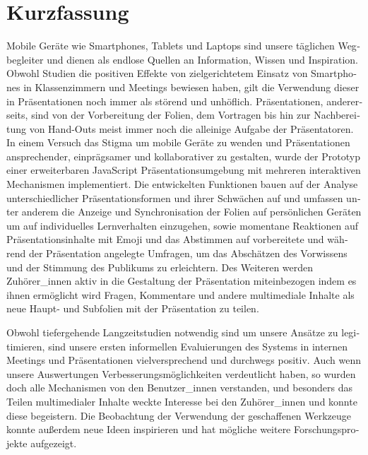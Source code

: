 \chapter{Kurzfassung}

\begin{german}
Mobile Geräte wie Smartphones, Tablets und Laptops sind unsere täglichen Wegbegleiter und dienen als endlose Quellen an Information, Wissen und Inspiration. Obwohl Studien die positiven Effekte von zielgerichtetem Einsatz von Smartphones in Klassenzimmern und Meetings bewiesen haben, gilt die Verwendung dieser in Präsentationen noch immer als störend und unhöflich. Präsentationen, andererseits, sind von der Vorbereitung der Folien, dem Vortragen bis hin zur Nachbereitung von Hand-Outs meist immer noch die alleinige Aufgabe der Präsentatoren. In einem Versuch das Stigma um mobile Geräte zu wenden und Präsentationen ansprechender, einprägsamer und kollaborativer zu gestalten, wurde der Prototyp einer erweiterbaren JavaScript Präsentationsumgebung mit mehreren interaktiven Mechanismen implementiert. Die entwickelten Funktionen bauen auf der Analyse unterschiedlicher Präsentationsformen und ihrer Schwächen auf und umfassen unter anderem die Anzeige und Synchronisation der Folien auf persönlichen Geräten um auf individuelles Lernverhalten einzugehen, sowie momentane Reaktionen auf Präsentationsinhalte mit Emoji und das Abstimmen auf vorbereitete und während der Präsentation angelegte Umfragen, um das Abschätzen des Vorwissens und der Stimmung des Publikums zu erleichtern. Des Weiteren werden Zuhörer\_innen aktiv in die Gestaltung der Präsentation miteinbezogen indem es ihnen ermöglicht wird Fragen, Kommentare und andere multimediale Inhalte als neue Haupt- und Subfolien mit der Präsentation zu teilen.

Obwohl tiefergehende Langzeitstudien notwendig sind um unsere Ansätze zu legitimieren, sind unsere ersten informellen Evaluierungen des Systems in internen Meetings und Präsentationen vielversprechend und durchwegs positiv. Auch wenn unsere Auswertungen Verbesserungsmöglichkeiten verdeutlicht haben, so wurden doch alle Mechanismen von den Benutzer\_innen verstanden, und besonders das Teilen multimedialer Inhalte weckte Interesse bei den Zuhörer\_innen und konnte diese begeistern. Die Beobachtung der Verwendung der geschaffenen Werkzeuge konnte außerdem neue Ideen inspirieren und hat mögliche weitere Forschungsprojekte aufgezeigt.
\end{german}